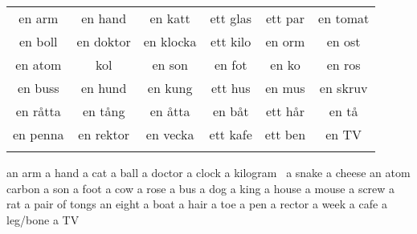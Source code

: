 \begin{center}
    \begin{tabular}{|c c c c c c|}
        \hline
        en arm & en hand & en katt & ett glas & ett par & en tomat \\
        en boll & en doktor & en klocka & ett kilo & en orm & en ost \\
        en atom & kol & en son & en fot & en ko & en ros \\
        en buss & en hund & en kung & ett hus & en mus & en skruv \\
        en råtta & en tång & en åtta & en båt & ett hår & en tå \\
        en penna & en rektor & en vecka & ett kafe & ett ben & en TV \\
         &&&&& \\
        \hline
    \end{tabular}
\end{center}

\begin{questions}
    \begin{multicols}{3}
        \raggedcolumns
        \question an arm \fillin
        \question a hand \fillin
        \question a cat \fillin
        \question a ball \fillin
        \question a doctor \fillin
        \question a clock \fillin
        \question a kilogram \fillin
        \question a snake \fillin
        \question a cheese \fillin
        \question an atom \fillin
        \question carbon \fillin
        \question a son \fillin
        \question a foot \fillin
        \question a cow \fillin
        \question a rose \fillin
        \question a bus \fillin
        \question a dog \fillin
        \question a king \fillin
        \question a house \fillin
        \question a mouse \fillin
        \question a screw \fillin
        \question a rat \fillin
        \question a pair of tongs \fillin
        \question an eight \fillin
        \question a boat \fillin
        \question a hair \fillin
        \question a toe \fillin
        \question a pen \fillin
        \question a rector \fillin
        \question a week \fillin
        \question a cafe \fillin
        \question a leg/bone \fillin
        \question a TV \fillin
    \end{multicols}
\end{questions}